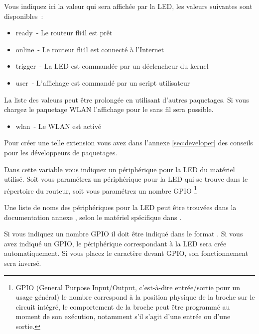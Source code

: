 \begin{description}

  Vous indiquez ici la valeur qui sera affichée par la LED, les valeurs
  suivantes sont disponibles~:

  \begin{itemize}
    \item ready~- Le routeur fli4l est prêt
    \item online~- Le routeur fli4l est connecté à l'Internet
    \item trigger~- La LED est commandée par un déclencheur du kernel
    \item user~- L'affichage est commandé par un script utilisateur
  \end{itemize}


  La liste des valeurs peut être prolongée en utilisant d'autres paquetages.
  Si vous chargez le paquetage WLAN l'affichage pour le sans fil sera possible.
  \begin{itemize}
    \item wlan~- Le WLAN est activé
  \end{itemize}

  Pour créer une telle extension vous avez dans l'annexe \ref{sec:developer}
  des conseils pour les développeurs de paquetages.


  Dans cette variable vous indiquez un périphérique pour la LED du matériel utilisé. Soit
  vous paramétrez un périphérique pour la LED qui se trouve dans le répertoire 
  du routeur, soit vous paramétrez un nombre GPIO \footnote{GPIO (General Purpose Input/Output,
  c'est-à-dire entrée/sortie pour un usage général) le nombre correspond à la position
  physique de la broche sur le circuit intégré, le comportement de la broche peut être
  programmé au moment de son exécution, notamment s'il s'agit d'une entrée ou d'une sortie.}

  Une liste de noms des périphériques pour la LED peut être trouvées dans la documentation
  annexe ,
  selon le matériel spécifique dans .

  Si vous indiquez un nombre GPIO il doit être indiqué dans le format . Si vous
  avez indiqué un GPIO, le périphérique correspondant à la LED sera crée automatiquement.
  Si vous placez le caractère \var{/} devant GPIO, son fonctionnement sera inversé.


\end{description}
